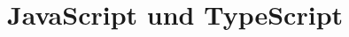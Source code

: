 \section{JavaScript und TypeScript}

\begin{comment}
    - Unterschiede und EInsatz von JavaScript und TypeScript
\end{comment}